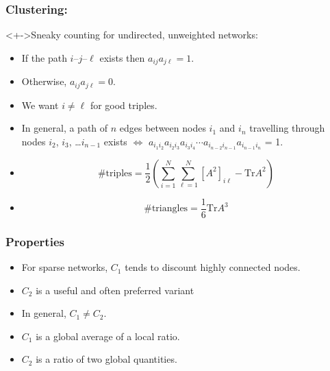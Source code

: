 \begin{frame}
  \frametitle{Clustering:}

  \begin{block}<+->{Sneaky counting for undirected, unweighted networks:}
    \begin{itemize}
    \item<+->
      If the path $i$--$j$--$\ell$ exists 
      then $a_{ij} a_{j\ell} = 1$.
    \item<+->
      Otherwise, $a_{ij} a_{j\ell} = 0$.
    \item<+->
      We want $i \ne \ell$ for good triples.
    \item<+->
      In general, a path of $n$ edges between nodes $i_{1}$ and $i_{n}$ travelling
      through nodes $i_{2}$, $i_{3}$, \ldots $i_{n-1}$ exists $\iff$
      $a_{i_{1}i_{2}} a_{i_{2}i_{3}} a_{i_{3}i_{4}} \cdots a_{i_{n-2}i_{n-1}} a_{i_{n-1} i_{n}}$ = 1.
    \item<+->
      $$ 
      \#\textrm{triples}
      = 
      \frac{1}{2} 
      \left(
        \sum_{i=1}^{N}
        \sum_{\ell=1}^{N}
        \left[ 
          A^2 
        \right]_{i\ell}
        -
        \textrm{Tr}
        A^2
    \right)
      $$
    \item<+->
      $$ 
      \#\textrm{triangles} 
      = 
      \frac{1}{6} 
      \textrm{Tr} 
      A^3 
      $$
    \end{itemize}
  \end{block}

\end{frame}

\begin{frame}
  \frametitle{Properties}

  \begin{block}{}
  \begin{itemize}
  \item<1-> For sparse networks, $C_1$ tends to discount
    highly connected nodes.
  \item<2-> $C_2$ is a useful and often preferred variant
  \item<3-> In general, $C_1 \ne C_2$.
  \item<4-> $C_1$ is a global average of a local ratio.
  \item<5-> $C_2$ is a ratio of two global quantities.
  \end{itemize}
  \end{block}

\end{frame}

